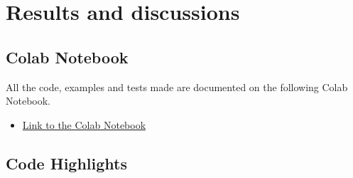 \documentclass[10pt, a4paper]{article}
\begin{document}
\section{Results and discussions}

\subsection{Colab Notebook}

All the code, examples and tests made are documented on the following Colab Notebook. 

\begin{itemize}
  \item \href{https://colab.research.google.com/drive/1CsJtybd_mc1ewyKjQQcVnqqpMvM5mJwv?usp=sharing}{Link to the Colab Notebook}
\end{itemize}

\subsection{Code Highlights}
\end{document}
